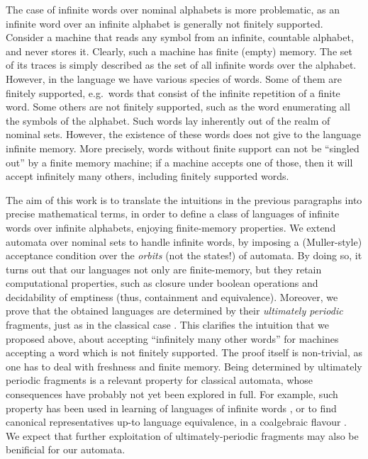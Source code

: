 The case of infinite words over nominal alphabets is more problematic, as an infinite word over an infinite alphabet is generally not finitely supported. Consider a machine that reads any symbol from an infinite, countable alphabet, and never stores it. Clearly, such a machine has finite (empty) memory. The set of its traces is simply described as the set of all infinite words over the alphabet. However, in the language we have various species of words. Some of them are finitely supported, e.g.\ words that consist of the infinite repetition of a finite word. Some others are not finitely supported, such as the word enumerating all the symbols of the alphabet. Such words lay inherently out of the realm of nominal sets. However, the existence of these words does not give to the language infinite memory. More precisely,  words without finite support can not be ``singled out'' by a finite memory machine; if a machine accepts one of those, then it will accept infinitely many others, including finitely supported words.  

The aim of this work is to translate the intuitions in the previous paragraphs into precise mathematical terms, in order to define a class of languages of infinite words over infinite alphabets, enjoying finite-memory properties. We extend automata over nominal sets to handle infinite words, by imposing a (Muller-style) acceptance condition 
over the \emph{orbits} (not the states!) of automata. By doing so, it turns out that our languages not only are finite-memory, but they retain computational properties, such as closure under boolean operations and decidability of emptiness (thus, containment and equivalence). Moreover, we prove that the obtained languages are determined by their \emph{ultimately periodic} fragments, just as in the classical case \cite{CalbrixNP93}. This clarifies the intuition that we proposed above, about accepting ``infinitely many other words'' for machines accepting a word which is not finitely supported. 
%
The proof itself is non-trivial, as one has to deal with freshness and finite memory.
Being determined by ultimately periodic fragments is
a relevant property for classical automata, whose consequences have probably not yet been explored in full.
%
For example, such property has been used in learning of languages of infinite words \cite{FCCTW08}, or to find canonical representatives up-to language equivalence, in a coalgebraic flavour \cite{CV12}. We expect that further exploitation of ultimately-periodic fragments may also be benificial for 
our automata.%



